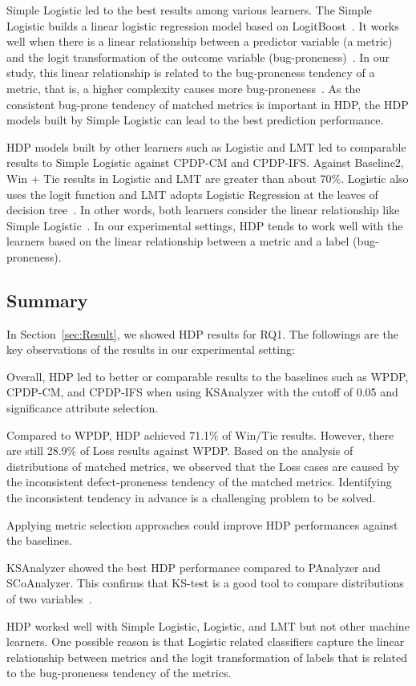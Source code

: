 Simple Logistic led to the best results among various
learners. The Simple Logistic builds a linear logistic regression model based on LogitBoost~\cite{Landwehr2005}. It works well when there is a linear
relationship between a predictor variable (a metric) and the logit
transformation of the outcome variable (bug-proneness)~\cite{Landwehr2005,Logstic}.
In our study, this linear relationship is related to the bug-proneness tendency of
a metric, that is, a higher complexity causes more bug-proneness~\cite{DAmbros12,Menzies07,Rahman13}.
As the consistent bug-prone tendency of matched metrics is important in HDP, the
HDP models built by Simple Logistic can lead to the best prediction
performance.

HDP models built by other learners such as
Logistic and LMT led to comparable results to Simple Logistic against
CPDP-CM and CPDP-IFS. Against Baseline2, Win + Tie results in
Logistic and LMT are greater than about 70\%.
Logistic also uses the logit function and LMT adopts Logistic
Regression at the leaves of decision tree~\cite{Ghotra15}. In other words, both
learners consider the linear relationship like Simple Logistic~\cite{Landwehr2005,Logstic}. In our experimental settings, HDP tends to
work well with the learners based on the linear relationship between a metric
and a label (bug-proneness).

\subsection{Summary}
In Section~\ref{sec:Result}, we showed HDP results for RQ1. The followings are the key observations of the results in our experimental setting:
\squishlist
    \item Overall, HDP led to better or comparable results to the baselines such as WPDP, CPDP-CM, and CPDP-IFS when using KSAnalyzer with the cutoff of 0.05 and significance attribute selection.
    \item Compared to WPDP, HDP achieved 71.1\% of Win/Tie results. However, there are still 28.9\% of Loss results against WPDP. Based on the analysis of distributions of matched metrics, we observed that the Loss cases are caused by the inconsistent defect-proneness tendency of the matched metrics. Identifying the inconsistent tendency in advance is a challenging problem to be solved. 
    \item Applying metric selection approaches could improve HDP performances against the baselines.
    \item KSAnalyzer showed the best HDP performance compared to PAnalyzer and SCoAnalyzer. This confirms that KS-test is a good tool to compare distributions of two variables~\cite{Lilliefors67,Massey51}.
    \item HDP worked well with Simple Logistic, Logistic, and LMT but not other machine learners. One possible reason is that Logistic related classifiers capture the linear relationship between metrics and the logit transformation of labels that is related to the bug-proneness tendency of the metrics.
\squishend
